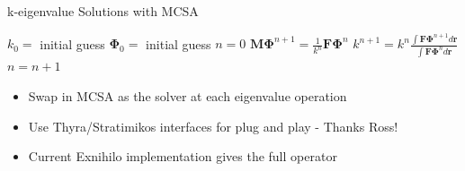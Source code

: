 \documentclass{beamer}
\begin{document}
\begin{frame}[fragile]{k-eigenvalue Solutions with MCSA}

  \begin{algorithm}[H]
    \caption{Power Iteration MCSA Scheme}
    \label{alg:power_iteration}
    \begin{algorithmic}
      \STATE $k_0 =$ initial guess
      \STATE $\mathbf{\Phi}_0 =$ initial guess
      \STATE $n = 0$
      \STATE $\mathbf{M} \mathbf{\Phi}^{n+1} = \frac{1}{k^n} \mathbf{F} \mathbf{\Phi}^n$
      \STATE $k^{n+1} = k^n \frac{\int \mathbf{F} \mathbf{\Phi}^{n+1} d\mathbf{r}}{\int
        \mathbf{F} \mathbf{\Phi}^n d\mathbf{r}}$
      \STATE $n = n+1$
      \ENDWHILE
    \end{algorithmic}
  \end{algorithm}

  \begin{itemize}
  \item Swap in MCSA as the solver at each eigenvalue operation
    \medskip
  \item Use Thyra/Stratimikos interfaces for plug and play - Thanks
    Ross!
    \medskip
  \item Current Exnihilo implementation gives the full operator
  \end{itemize}

\end{frame}
\end{document}
